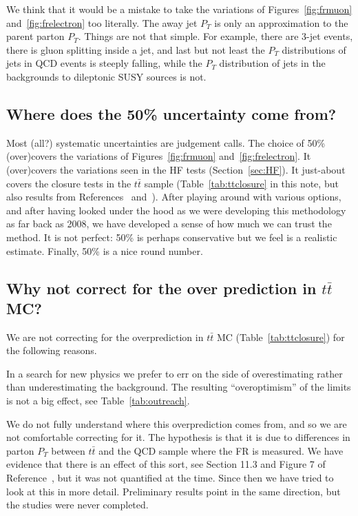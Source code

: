 We think that it would be a mistake to take the variations
of Figures~\ref{fig:frmuon} and~\ref{fig:frelectron} too 
literally.  The away jet $P_T$ is only an approximation
to the parent parton $P_T$.  Things are not that simple.
For example, there are 3-jet events, there is gluon splitting
inside a jet, and last but not least the $P_T$ distributions
of jets in QCD events is steeply falling, while the $P_T$ 
distribution of jets in the backgrounds to dileptonic SUSY 
sources is not.  

\subsection{Where does the 50\% uncertainty come from?}
\label{sec:FRunc}

Most (all?) systematic uncertainties are judgement calls.
The choice of 50\% (over)covers the variations of 
Figures~\ref{fig:frmuon} and~\ref{fig:frelectron}. It 
(over)covers the variations seen in the HF tests 
(Section~\ref{sec:HF}). It just-about covers the 
closure tests in the $t\bar{t}$ sample (Table~\ref{tab:ttclosure}
in this note, but also results from References~\cite{ssnote2011}
and~\cite{frmethod}).
After playing around with various
options, and after having looked under the hood as we were developing
this methodology as far back as 2008, we have developed a sense
of how much we can trust the method.  It is not perfect:
50\% is perhaps conservative but we feel is a  
realistic estimate.  Finally, 50\% is a nice round number.

\subsection{Why not correct for the over prediction in $t\bar{t}$ MC?}
\label{sec:frcorrect}

We are not correcting for the overprediction in $t\bar{t}$ MC
(Table~\ref{tab:ttclosure}) for the following reasons.

In a search for new physics we prefer to err on the side of 
overestimating rather than underestimating the background.  The 
resulting ``overoptimism'' of the limits is not a big effect, 
see Table~\ref{tab:outreach}.

We do not fully understand where this overprediction 
comes from, and so we are not comfortable correcting for it.  
The hypothesis is that it is due to differences
in parton $P_T$ between $t\bar{t}$ and the QCD sample where
the FR is measured.  We have evidence that there is
an effect of this sort,
see Section 11.3 and Figure 7 of Reference~\cite{frmethod},
but it was not quantified at the time.  Since then we have 
tried to look at this in more detail. Preliminary results
point in the same direction, but the studies were never completed.

